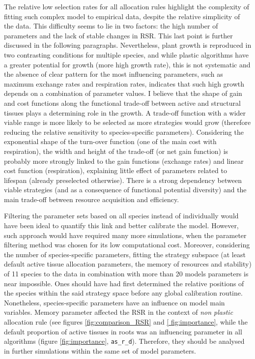 The relative low selection rates for all allocation rules highlight the complexity of fitting such complex model to empirical data, despite the relative simplicity of the data. This difficulty seems to lie in two factors: the high number of parameters and the lack of stable changes in RSR. This last point is further discussed in the following paragraphs. Nevertheless, plant growth is reproduced in two contrasting conditions for multiple species, and while plastic algorithms have a greater potential for growth (more high growth rate), this is not systematic and the absence of clear pattern for the most influencing parameters, such as maximum exchange rates and respiration rates, indicates that such high growth depends on a combination of parameter values. I believe that the shape of gain and cost functions along the functional trade-off between active and structural tissues plays a determining role in the growth. A trade-off function with a wider viable range is more likely to be selected as more strategies would grow (therefore reducing the relative sensitivity to species-specific parameters). Considering the exponential shape of the turn-over function (one of the main cost with respiration), the width and height of the trade-off (or net gain function) is probably more strongly linked to the gain functions (exchange rates) and linear cost function (respiration), explaining little effect of parameters related to lifespan (already preselected otherwise). There is a strong dependency between viable strategies (and as a consequence of functional potential diversity) and the main trade-off between resource acquisition and efficiency.

Filtering the parameter sets based on all species instead of individually would have been ideal to quantify this link and better calibrate the model. However, such approach would have required many more simulations, when the parameter filtering method was chosen for its low computational cost. Moreover, considering the number of species-specific parameters, fitting the strategy subspace (at least default active tissue allocation parameters, the memory of resources and stability) of 11 species to the data in combination with more than 20 models parameters is near impossible. Ones should have had first determined the relative positions of the species within the said strategy space before any global calibration routine. Nonetheless, species-specific parameters have an influence on model main variables. Memory parameter affected the RSR in the context of \textit{non plastic} allocation rule (see figures \ref{fig:comparison_RSR} and \ref{ fig:importance}, while the default proportion of active tissues in roots was an influencing parameter in all algorithms (figure \ref{fig:importance}, \texttt{as\_r\_d}). Therefore, they should be analysed in further simulations within the same set of model parameters.


